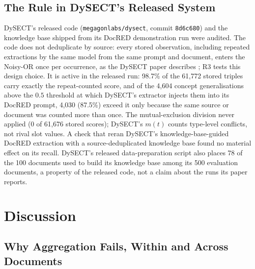 \documentclass[preprint,12pt,authoryear]{elsarticle}
\begin{document}
\subsection{The Rule in DySECT's Released System}
\label{sec:results-dysect}

DySECT's released code (\texttt{megagonlabs/dysect}, commit
\texttt{8d6c680}) and the knowledge base shipped from its DocRED
demonstration run were audited. The code does not deduplicate by source:
every stored observation, including repeated extractions by the same
model from the same prompt and document, enters the Noisy-OR once per
occurrence, as the DySECT paper describes
\citep[Sect.~2.2]{aminnaseri2026dysect}; R3 tests this design choice.
It is active in the released run: 98.7\% of the 61,772 stored triples
carry exactly the repeat-counted score, and of the 4,604 concept
generalisations above the $0.5$ threshold at which DySECT's extractor
injects them into its DocRED prompt, 4,030 (87.5\%) exceed it only
because the same source or document was counted more than once. The
mutual-exclusion division never applied (0 of 61,676 stored scores);
DySECT's $m(t)$ counts type-level conflicts, not rival slot values. A
check that reran DySECT's knowledge-base-guided DocRED extraction with a
source-deduplicated knowledge base found no material effect on its
recall. DySECT's released data-preparation script also places 78 of the
100 documents used to build its knowledge base among its 500 evaluation
documents, a property of the released code, not a claim about the runs
its paper reports.

\section{Discussion}
\label{sec:discussion}

\subsection{Why Aggregation Fails, Within and Across Documents}
\label{sec:discussion-docred}
\end{document}
